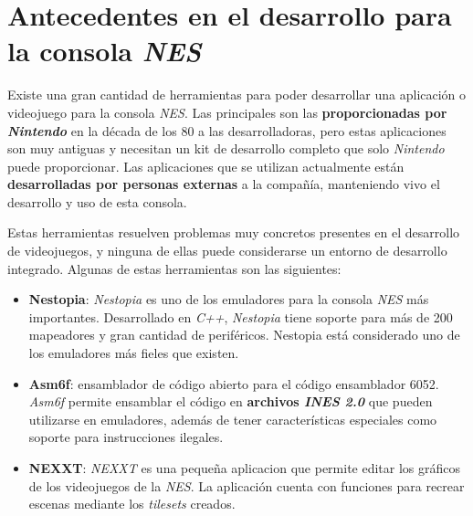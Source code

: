 \section{Antecedentes en el desarrollo para la consola \textit{NES}}
\label{sec:antecedentes-en-el-desarrollo-para-la-consola-nes}

Existe una gran cantidad de herramientas para poder desarrollar
una aplicación o videojuego para la consola \textit{NES}.
Las principales son las \textbf{proporcionadas por \textit{Nintendo}}
en la década de los 80 a las desarrolladoras, pero estas
aplicaciones son muy antiguas y necesitan un kit de desarrollo
completo que solo \textit{Nintendo} puede proporcionar.
Las aplicaciones que se utilizan actualmente están
\textbf{desarrolladas por personas externas} a la compañía,
manteniendo vivo el desarrollo y uso de esta consola.

\noindent Estas herramientas resuelven problemas muy concretos
presentes en el desarrollo de videojuegos, y ninguna
de ellas puede considerarse un entorno de desarrollo integrado.
Algunas de estas herramientas son las siguientes:

\begin{itemize}
    \item \textbf{Nestopia}: \textit{Nestopia} es uno de los emuladores
    para la consola \textit{NES} más importantes.
    Desarrollado en \textit{C++}, \textit{Nestopia} tiene soporte
    para más de 200 mapeadores y gran cantidad de periféricos.
    Nestopia está considerado uno de los emuladores más
    fieles que existen.
    \item \textbf{Asm6f}: ensamblador de código abierto
    para el código ensamblador 6052.
    \textit{Asm6f} permite ensamblar el código en
    \textbf{archivos \textit{INES 2.0}}
    que pueden utilizarse en emuladores, además
    de tener características especiales como soporte
    para instrucciones ilegales.
    \item \textbf{NEXXT}: \textit{NEXXT} es una pequeña
    aplicacion que permite editar los gráficos de los
    videojuegos de la \textit{NES}.
    La aplicación cuenta con funciones para recrear escenas
    mediante los \textit{tilesets} creados.
\end{itemize}